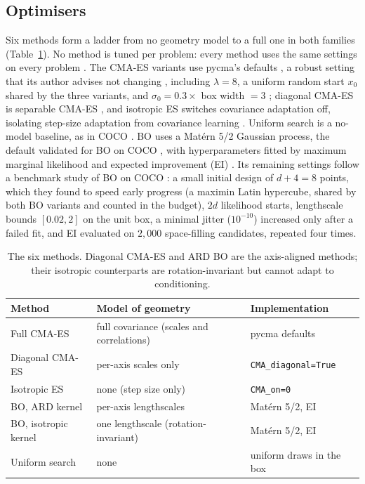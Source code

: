 \documentclass[12pt]{article}
\begin{document}
\subsection{Optimisers}
Six methods form a ladder from no geometry model to a full one in both families (Table~\ref{tab:methods}). No method is tuned per problem: every method uses the same settings on every problem \parencite{hansen2016procedure}. The CMA-ES variants use pycma's defaults \parencite{hansen2019pycma}, a robust setting that its author advises not changing \parencite[p.~32]{hansen2023tutorial}, including $\lambda=8$, a uniform random start $x_0$ shared by the three variants, and $\sigma_0=0.3\times$ box width $=3$ \parencite[p.~29]{hansen2023tutorial}; diagonal CMA-ES is separable CMA-ES \parencite{ros2008simple}, and isotropic ES switches covariance adaptation off, isolating step-size adaptation from covariance learning \parencite[p.~19]{hansen2023tutorial}. Uniform search is a no-model baseline, as in COCO \parencite{hansen2016procedure}. BO uses a Mat\'ern 5/2 Gaussian process, the default validated for BO on COCO \parencite{leriche2021revisiting}, with hyperparameters fitted by maximum marginal likelihood \parencite[p.~113]{rasmussen2006gpml} and expected improvement (EI) \parencite{jones1998ego}. Its remaining settings follow a benchmark study of BO on COCO \parencite{leriche2021revisiting}: a small initial design of $d+4=8$ points, which they found to speed early progress (a maximin Latin hypercube, shared by both BO variants and counted in the budget), $2d$ likelihood starts, lengthscale bounds $[0.02,2]$ on the unit box, a minimal jitter ($10^{-10}$) increased only after a failed fit, and EI evaluated on $2{,}000$ space-filling candidates, repeated four times.

\begin{table}[h]
\centering
\small
\begin{tabular}{lll}
\hline
Method & Model of geometry & Implementation \\
\hline
Full CMA-ES & full covariance (scales and correlations) & pycma defaults \\
Diagonal CMA-ES & per-axis scales only & \texttt{CMA\_diagonal=True} \\
Isotropic ES & none (step size only) & \texttt{CMA\_on=0} \\
BO, ARD kernel & per-axis lengthscales & Mat\'ern 5/2, EI \\
BO, isotropic kernel & one lengthscale (rotation-invariant) & Mat\'ern 5/2, EI \\
Uniform search & none & uniform draws in the box \\
\hline
\end{tabular}
\caption{The six methods. Diagonal CMA-ES and ARD BO are the axis-aligned methods; their isotropic counterparts are rotation-invariant but cannot adapt to conditioning.}
\label{tab:methods}
\end{table}
\end{document}
